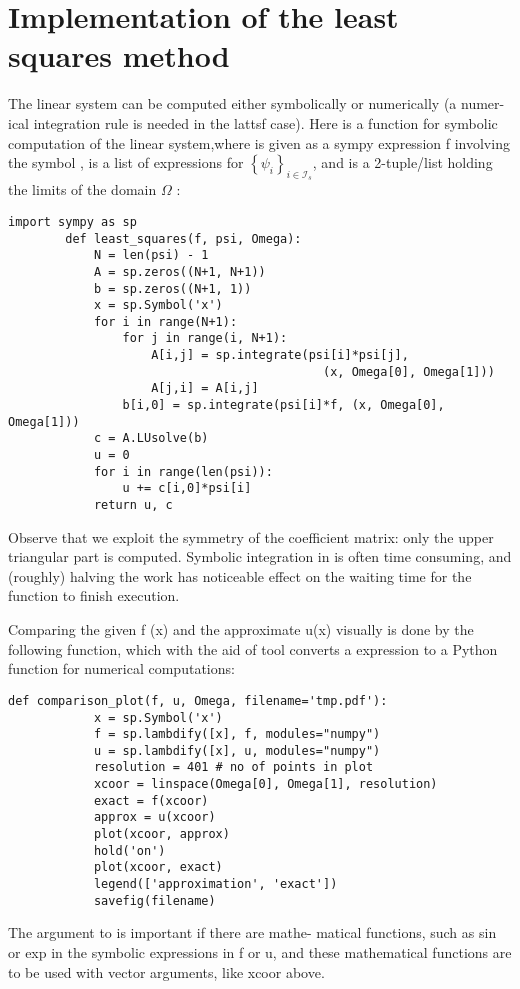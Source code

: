 \documentclass[../main.tex]{subfiles}
\begin{document}
	\section[Implementation of the least squares method]{Implementation of the least squares method}
	\label{sec:sec_2_4}
	\noindent The linear system can be computed either symbolically or numerically (a numer-
	ical integration rule is needed in the lattsf case). Here is a function for symbolic
	computation of the linear system,where  is given as a sympy expression f
	involving the symbol ,  is a list of expressions for $\left\{\psi_{i}\right\}_{i \in \mathcal{I}_{s}}$, and  is a 2-tuple/list holding the limits of the domain $\Omega$ :
	
	\begin{lstlisting}[numbers=none]
		import sympy as sp
		def least_squares(f, psi, Omega):
			N = len(psi) - 1
			A = sp.zeros((N+1, N+1))
			b = sp.zeros((N+1, 1))
			x = sp.Symbol('x')
			for i in range(N+1):
				for j in range(i, N+1):
					A[i,j] = sp.integrate(psi[i]*psi[j],
											(x, Omega[0], Omega[1]))
					A[j,i] = A[i,j]
				b[i,0] = sp.integrate(psi[i]*f, (x, Omega[0], Omega[1]))
			c = A.LUsolve(b)
			u = 0
			for i in range(len(psi)):
				u += c[i,0]*psi[i]
			return u, c
	\end{lstlisting}
	Observe that we exploit the symmetry of the coefficient matrix: only the
	upper triangular part is computed. Symbolic integration in  is often
	time consuming, and (roughly) halving the work has noticeable effect on the
	waiting time for the function to finish execution.
	
	Comparing the given f (x) and the approximate u(x) visually is done by
	the following function, which with the aid of  tool converts a
	 expression to a Python function for numerical computations:
	\begin{lstlisting}[numbers=none]
		def comparison_plot(f, u, Omega, filename='tmp.pdf'):
			x = sp.Symbol('x')
			f = sp.lambdify([x], f, modules="numpy")
			u = sp.lambdify([x], u, modules="numpy")
			resolution = 401 # no of points in plot
			xcoor = linspace(Omega[0], Omega[1], resolution)
			exact = f(xcoor)
			approx = u(xcoor)
			plot(xcoor, approx)
			hold('on')
			plot(xcoor, exact)
			legend(['approximation', 'exact'])
			savefig(filename)
	\end{lstlisting}
	The  argument to  is important if there are mathe-
	matical functions, such as sin or exp in the symbolic expressions in f or u, and
	these mathematical functions are to be used with vector arguments, like xcoor
	above.
	
\end{document}
